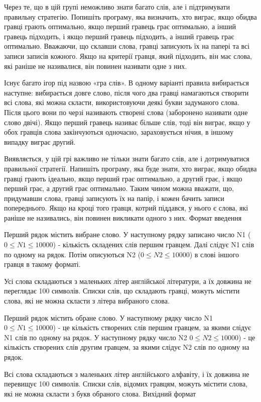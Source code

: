 \documentclass[]{article}
\begin{document}
Через те, що в цій групі неможливо знати багато слів, але і підтримувати правильну стратегію. Попишіть програму, яка визначить, хто виграє, якщо обидва гравці грають оптимально, якщо перший гравець грає оптимально, а інший гравець підходить, і якщо перший гравець підходить, а інший гравець грає оптимально. Вважаючи, що склавши слова, гравці записують їх на папері та всі записи записів кожного. Якщо на критерії гравця, який підходить, він має слова, які раніше не називалися, він повинен називати одне з них.

Існує багато ігор під назвою «гра слів». В одному варіанті правила вибирається наступне: вибирається довге слово, після чого два гравці намагаються створити всі слова, які можна скласти, використовуючи деякі букви задуманого слова. Після цього вони по черзі називають створені слова (заборонено називати одне слово двічі). Якщо перший гравець називає більше слів, тоді він виграє, якщо у обох гравців слова закінчуються одночасно, зараховується нічия, в іншому випадку виграє другий.

Виявляється, у цій грі важливо не тільки знати багато слів, але і дотримуватися правильної стратегії. Напишіть програму, яка буде знати, хто виграє, якщо обидва гравці грають ідеально, якщо перший грає оптимально, а другий грає, і якщо перший грає, а другий грає оптимально. Таким чином можна вважати, що, придумавши слова, гравці записують їх на папір, і кожен бачить записи попереднього. Якщо на кроці того гравця, котрий піддався, у нього є слова, які раніше не називались, він повинен викликати одного з них.
Формат введення

Перший рядок містить вибране слово. У наступному рядку записано число N1 ($0 \le N1 \le 10000$) - кількість складених слів першим гравцем. Далі слідує N1 слів по одному на рядок. Потім описуються N2 ($0 \le N2 \le 10000$) в слові іншого гравця в такому форматі.

Усі слова складаються з маленьких літер англійської літератури, а їх довжина не переглядає 100 символів. Списки слів, що складають гравці, можуть містити слова, які не можна скласти з літера вибраного слова.

Перший рядок містить обране слово. У наступному рядку число N1 $0 \le N1 \le 10000$) - це кількість створених слів першим гравцем, за якими слідує N1 слів по одному на рядок. У наступному рядку число N2 $0 \le N2 \le 10000$) - це кількість створених слів другим гравцем, за якими слідує N2 слів по одному на рядок.

Всі слова складаються з маленьких літер англійського алфавіту, і їх довжина не перевищує 100 символів. Списки слів, відомих гравцям, можуть містити слова, які не можна скласти з букв обраного слова.
Вихідний формат
\end{document}
